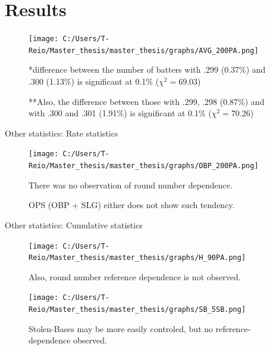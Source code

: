 \documentclass[dvipdfmx,12pt]{beamer}
\begin{document}
\section{Results}
\begin{frame}
  \begin{figure}
    \centering
    \texttt{[image: C:/Users/T-Reio/Master\_thesis/master\_thesis/graphs/AVG\_200PA.png]}
\label{AVG}
    \footnotesize

    *difference between the number of batters with .299 (0.37\%)
     and .300 (1.13\%) is significant at 0.1\% ($\chi^2 = 69.03$)

     **Also, the difference between those with .299, .298 (0.87\%)
     and with .300 and .301 (1.91\%) is significant at 0.1\%
     ($\chi^2 = 70.26$)
  \end{figure}
\end{frame}
\begin{frame}
  Other statistics: Rate statistics
  \begin{figure}
    \centering
    \texttt{[image: C:/Users/T-Reio/Master\_thesis/master\_thesis/graphs/OBP\_200PA.png]}
    \footnotesize

    There was no observation of round number dependence.

    OPS (OBP + SLG) either does not show such tendency.
\label{OBP}
  \end{figure}
\end{frame}

\begin{frame}
 Other statistics: Cumulative statistics
 \begin{figure}
   \centering
   \texttt{[image: C:/Users/T-Reio/Master\_thesis/master\_thesis/graphs/H\_90PA.png]}
   \footnotesize

   Also, round number reference dependence is not observed.

\label{Base-Hit}
 \end{figure}
\end{frame}

\begin{frame}
  \begin{figure}
    \texttt{[image: C:/Users/T-Reio/Master\_thesis/master\_thesis/graphs/SB\_5SB.png]}

    \footnotesize
    Stolen-Bases may be more easily controled, but no reference-dependence
    observed.
\label{Stolen-Bases}
  \end{figure}
\end{frame}
\end{document}
